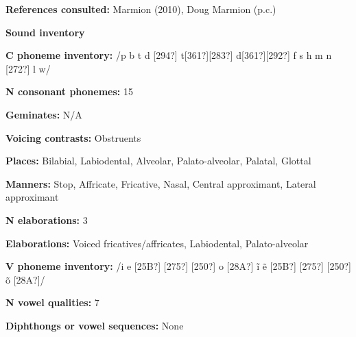 \begin{styleBody}
\textbf{References consulted: }Marmion (2010), Doug Marmion (p.c.)
\end{styleBody}

\begin{styleBody}
\textbf{Sound inventory}
\end{styleBody}

\begin{styleBody}
\textbf{C phoneme inventory:} /p b t d [294?] t[361?][283?] d[361?][292?] f s h m n [272?] l w/
\end{styleBody}

\begin{styleBody}
\textbf{N consonant phonemes:} 15
\end{styleBody}

\begin{styleBody}
\textbf{Geminates:} N/A
\end{styleBody}

\begin{styleBody}
\textbf{Voicing contrasts:} Obstruents
\end{styleBody}

\begin{styleBody}
\textbf{Places:} Bilabial, Labiodental, Alveolar, Palato-alveolar, Palatal, Glottal
\end{styleBody}

\begin{styleBody}
\textbf{Manners:} Stop, Affricate, Fricative, Nasal, Central approximant, Lateral approximant
\end{styleBody}

\begin{styleBody}
\textbf{N elaborations:} 3
\end{styleBody}

\begin{styleBody}
\textbf{Elaborations:} Voiced fricatives/affricates, Labiodental, Palato-alveolar
\end{styleBody}

\begin{styleBody}
\textbf{V phoneme inventory:} /i e [25B?] [275?] [250?] o [28A?] \~{i} \~{e} [25B?] [275?] [250?] \~{o} [28A?]/
\end{styleBody}

\begin{styleBody}
\textbf{N vowel qualities:} 7
\end{styleBody}

\begin{styleBody}
\textbf{Diphthongs or vowel sequences:} None
\end{styleBody}

